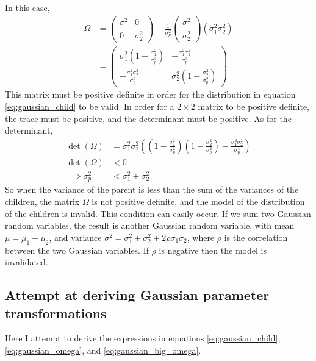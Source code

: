\documentclass[a4paper,12pt]{article}
\theoremstyle{definition}
\begin{document}
In this case,
\begin{align*}
	\Omega	&	= \begin{pmatrix}
		\sigma_1^2	&	0						\\
		0						&	\sigma_2^2
	\end{pmatrix}
	- \frac{1}{\sigma_p^2}\begin{pmatrix} \sigma_1^2 \\
																				\sigma_2^2
																			\end{pmatrix}
																			(\sigma_1^2 \sigma_2^2) \\
					& = \begin{pmatrix}
								\sigma_1^2 \left(1 - \frac{\sigma_1^2}{\sigma_p^2}\right)	&	-\frac{\sigma_1^2 \sigma_2^2}{\sigma_p^2}	\\
								-\frac{\sigma_1^2 \sigma_2^2}{\sigma_p^2}			&	\sigma_2^2 \left(1 - \frac{\sigma_2^2}{\sigma_p^2} \right)
							\end{pmatrix}
\end{align*}
This matrix must be positive definite in order for the distribution in equation \ref{eq:gaussian_child} to be valid. In order for a $2 \times 2$ matrix to be positive definite, the trace must be positive, and the determinant must be positive. As for the determinant,
\begin{align*}
	\det (\Omega) & = \sigma_1^2 \sigma_2^2 \left( \left( 1 - \frac{\sigma_1^2}{\sigma_p^2} \right)\left( 1 - \frac{\sigma_2^2}{\sigma_p^2} \right) - \frac{\sigma_1^2 \sigma_2^2}{\sigma_p^4}  \right) \\
	\det (\Omega) & < 0 \\
	\implies \sigma_p^2 & < \sigma_1^2 + \sigma_2^2
\end{align*}
So when the variance of the parent is less than the sum of the variances of the children, the matrix $\Omega$ is not positive definite, and the model of the distribution of the children is invalid. This condition can easily occur. If we sum two Gaussian random variables, the result is another Gaussian random variable, with mean $\mu = \mu_1 + \mu_2$, and variance $\sigma^2 = \sigma_1^2 + \sigma_2^2 + 2\rho \sigma_1 \sigma_2$, where $\rho$ is the correlation between the two Gaussian variables. If $\rho$ is negative then the model is invalidated.

\subsection{Attempt at deriving Gaussian parameter transformations}
Here I attempt to derive the expressions in equations \ref{eq:gaussian_child},  \ref{eq:gaussian_omega}, and \ref{eq:gaussian_big_omega}.
\end{document}
